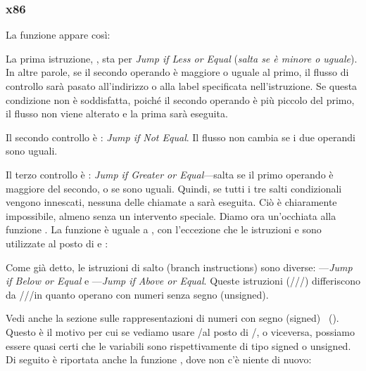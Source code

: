 \subsubsection{x86}


La funzione  appare così:




La prima istruzione, \JLE, sta per \emph{Jump if Less or Equal} (\emph{salta se è minore o uguale}). 
In altre parole, se il secondo operando è
maggiore o uguale al primo, il flusso di controllo sarà pasato all'indirizzo o alla label specificata nell'istruzione. 
Se questa condizione non è soddisfatta, poiché il secondo operando è più piccolo del primo, il flusso non viene alterato e la prima \printf sarà eseguita.

Il secondo controllo è \JNE: \emph{Jump if Not Equal}.
Il flusso non cambia se i due operandi sono uguali.

Il terzo controllo è \JGE: \emph{Jump if Greater or Equal}---salta se il primo operando è maggiore del secondo, o se sono uguali.
Quindi, se tutti i tre salti condizionali vengono innescati, nessuna delle chiamate a \printf sarà eseguita.
Ciò è chiaramente impossibile, almeno senza un intervento speciale.
Diamo ora un'occhiata alla funzione .
La funzione  è uguale a , con l'eccezione che le istruzioni \JBE e \JAE
sono utilizzate al posto di \JLE e \JGE:




Come già detto, le istruzioni di salto (branch instructions) sono diverse:
\JBE---\emph{Jump if Below or Equal} e \JAE---\emph{Jump if Above or Equal}.
Queste istruzioni (/\JAE/\JB/\JBE) differiscono da \JG/\JGE/\JL/\JLE in quanto operano con numeri senza segno (unsigned).


Vedi anche la sezione sulle rappresentazioni di numeri con segno (signed) ~().
Questo è il motivo per cui se vediamo usare \JG/\JL al posto di /\JB, o viceversa,
possiamo essere quasi certi che le variabili sono rispettivamente di tipo signed o unsigned.
Di seguito è riportata anche la funzione \main, dove non c'è niente di nuovo:

